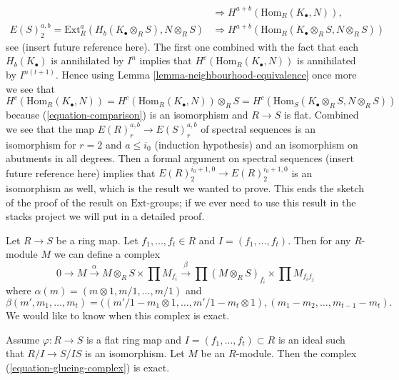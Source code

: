 \begin{remark}
\begin{align*}
& \Rightarrow
H^{a + b}(\text{Hom}_R(K_\bullet, N)), \\
E(S)_2^{a, b} = \text{Ext}^a_R(H_b(K_\bullet \otimes_R S), N \otimes_R S)
& \Rightarrow
H^{a + b}(\text{Hom}_R(K_\bullet \otimes_R S, N \otimes_R S))
\end{align*}
see (insert future reference here).
The first one combined with the fact that each $H_b(K_\bullet)$
is annihilated by $I^n$ implies that $H^c(\text{Hom}_R(K_\bullet, N))$
is annihilated by $I^{n(t + 1)}$. Hence using
Lemma \ref{lemma-neighbourhood-equivalence}
once more we see that
$$
H^c(\text{Hom}_R(K_\bullet, N)) =
H^c(\text{Hom}_R(K_\bullet, N)) \otimes_R S =
H^c(\text{Hom}_S(K_\bullet \otimes_R S, N \otimes_R S))
$$
because (\ref{equation-comparison}) is an isomorphism and $R \to S$ is flat.
Combined we see that the map $E(R)_r^{a, b} \to E(S)_r^{a, b}$ of spectral
sequences is an isomorphism for $r = 2$ and $a \leq i_0$ (induction hypothesis)
and an isomorphism on abutments in all degrees.
Then a formal argument on spectral sequences (insert future
reference here) implies that
$E(R)_2^{i_0 + 1, 0} \to E(R)_2^{i_0 + 1, 0}$
is an isomorphism as well, which is the result we wanted to prove.
This ends the sketch of the proof of the result on $\text{Ext}$-groups;
if we ever need to use this result in the stacks project we will put in
a detailed proof.
\end{remark}

\noindent
Let $R \to S$ be a ring map.
Let $f_1, \ldots, f_t \in R$ and $I = (f_1, \ldots, f_t)$.
Then for any $R$-module $M$ we can define a complex
\begin{equation}
\label{equation-glueing-complex}
0 \to M \xrightarrow{\alpha}
M \otimes_R S \times \prod M_{f_i} \xrightarrow{\beta}
\prod (M \otimes_R S)_{f_i}
\times
\prod M_{f_if_j}
\end{equation}
where $\alpha(m) = (m \otimes 1, m/1, \ldots, m/1)$ and
$$
\beta(m', m_1, \ldots, m_t) =
((m'/1 - m_1 \otimes 1, \ldots, m'/1 - m_t \otimes 1),
(m_1 - m_2, \ldots, m_{t - 1} - m_t).
$$
We would like to know when this complex is exact.

\begin{lemma}
\label{lemma-recover-module-from-glueing-data}
Assume $\varphi : R \to S$ is a flat ring map and
$I = (f_1, \ldots, f_t) \subset R$ is an ideal such that
$R/I \to S/IS$ is an isomorphism.
Let $M$ be an $R$-module. Then the
complex (\ref{equation-glueing-complex})
is exact.
\end{lemma}

